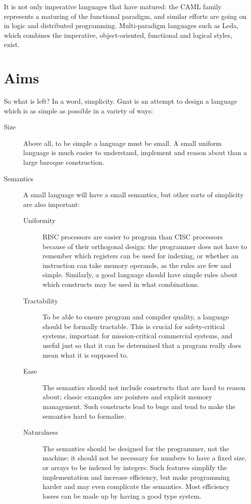 \documentclass[english]{article}
\begin{document}
It is not only imperative languages that have matured: the CAML family represents a maturing of the functional paradigm, and similar efforts are going on in logic and distributed programming. Multi-paradigm languages such as Leda, which combines the imperative, object-oriented, functional and logical styles, exist.



\section{Aims}

So what is left? In a word, simplicity. Gnat is an attempt to design a language which is as simple as possible in a variety of ways:

\begin{description}
\item[Size]Above all, to be simple a language must be small. A small uniform language is much easier to understand, implement and reason about than a large baroque construction.

\item[Semantics]A small language will have a small semantics, but other sorts of simplicity are also important:
\begin{description}
\item[Uniformity]RISC processors are easier to program than CISC processors because of their orthogonal design: the programmer does not have to remember which registers can be used for indexing, or whether an instruction can take memory operands, as the rules are few and simple. Similarly, a good language should have simple rules about which constructs may be used in what combinations.
\item[Tractability]To be able to ensure program and compiler quality, a language should be formally tractable. This is crucial for safety-critical systems, important for mission-critical commercial systems, and useful just so that it can be determined that a program really does mean what it is supposed to.
\item[Ease]The semantics should not include constructs that are hard to reason about; classic examples are pointers and explicit memory management. Such constructs lead to bugs and tend to make the semantics hard to formalise.
\item[Naturalness]The semantics should be designed for the programmer, not the machine: it should not be necessary for numbers to have a fixed size, or arrays to be indexed by integers. Such features simplify the implementation and increase efficiency, but make programming harder and may even complicate the semantics. Most efficiency losses can be made up by having a good type system.
\end{description}


\end{description}
\end{document}
